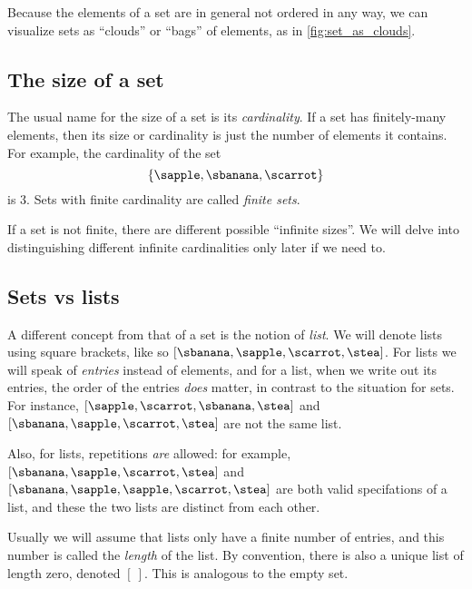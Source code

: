 Because the elements of a set are in general not ordered in any way, we can visualize sets as ``clouds'' or ``bags'' of elements, as in \cref{fig:set_as_clouds}.

\subsection{The size of a set}

The usual name for the size of a set is its \emph{cardinality}. If a set has finitely-many elements, then its size or cardinality is just the number of elements it contains. For example, the cardinality of the set
\begin{equation}
\{ \sapple, \sbanana, \scarrot \}
\end{equation}
is $3$. Sets with finite cardinality are called \emph{finite sets}.

If a set is not finite, there are different possible ``infinite sizes''. We will delve into distinguishing different infinite cardinalities only later if we need to.


\subsection{Sets vs lists}

A different concept from that of a set is the notion of \emph{list}.
We will denote lists using square brackets, like so $[\sbanana, \sapple, \scarrot, \stea]$.
For lists we will speak of \emph{entries} instead of elements, and for a list, when we write out its entries, the order of the entries \emph{does} matter, in contrast to the situation for sets.
For instance, $[ \sapple, \scarrot, \sbanana, \stea]$ and $[\sbanana, \sapple, \scarrot, \stea]$ are not the same list.

Also, for lists, repetitions \emph{are} allowed: for example, $[\sbanana, \sapple, \scarrot, \stea]$ and $[\sbanana, \sapple, \sapple, \scarrot, \stea]$ are both valid specifations of a list, and these the two lists are distinct from each other.

Usually we will assume that lists only have a finite number of entries, and this number is called the \emph{length} of the list. By convention, there is also a unique list of length zero, denoted $[ \ ]$. This is analogous to the empty set.


